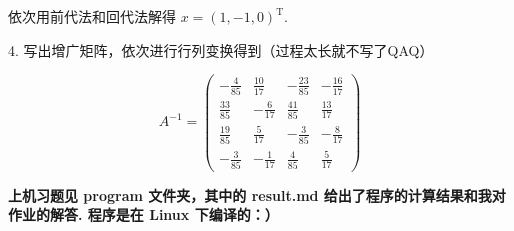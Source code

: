 \documentclass[UTF8]{ctexart}
\begin{document}
依次用前代法和回代法解得 $x=(1,-1,0)^{\mathrm{T}}$.

\newpage

4. 写出增广矩阵，依次进行行列变换得到（过程太长就不写了QAQ）

\[A^{-1}=\begin{pmatrix}
    -\frac{4}{85} & \frac{10}{17} & -\frac{23}{85} & -\frac{16}{17} \\
    \frac{33}{85} & -\frac{6}{17} & \frac{41}{85} & \frac{13}{17} \\
    \frac{19}{85} & \frac{5}{17} & -\frac{3}{85} & -\frac{8}{17} \\
    -\frac{3}{85} & -\frac{1}{17} & \frac{4}{85} & \frac{5}{17}
\end{pmatrix}\]

\textbf{上机习题见 program 文件夹，其中的 result.md 给出了程序的计算结果和我对作业的解答. 程序是在 Linux 下编译的：）}
\end{document}
